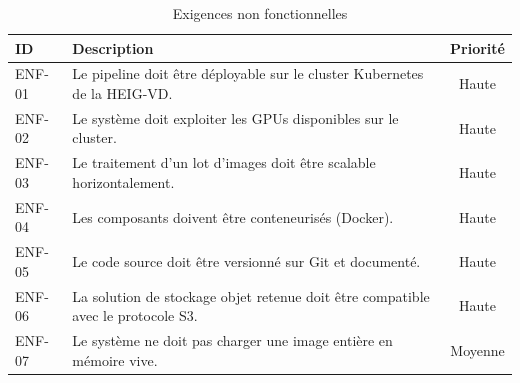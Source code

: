 \begin{table}[H]
\centering
\begin{tabular}{|l|p{10cm}|c|}
\hline
\textbf{ID} & \textbf{Description} & \textbf{Priorité} \\
\hline
ENF-01 & Le pipeline doit être déployable sur le cluster Kubernetes de la HEIG-VD. & Haute \\
\hline
ENF-02 & Le système doit exploiter les GPUs disponibles sur le cluster. & Haute \\
\hline
ENF-03 & Le traitement d'un lot d'images doit être scalable horizontalement. & Haute \\
\hline
ENF-04 & Les composants doivent être conteneurisés (Docker). & Haute \\
\hline
ENF-05 & Le code source doit être versionné sur Git et documenté. & Haute \\
\hline
ENF-06 & La solution de stockage objet retenue doit être compatible avec le protocole S3. & Haute \\
\hline
ENF-07 & Le système ne doit pas charger une image entière en mémoire vive. & Moyenne \\
\hline
\end{tabular}
\caption{Exigences non fonctionnelles}
\label{tab:exigences-non-fonctionnelles}
\end{table}
